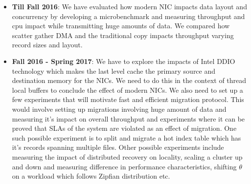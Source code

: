 \begin{itemize}
\item{\textbf{Till Fall 2016}:} We have evaluated how modern NIC impacts data layout 
and concurrency by developing a microbenchmark and measuring throughput and cpu 
impact while transmitting huge amounts of data. We compared how scatter gather DMA 
and the traditional copy impacts throughput varying record sizes and layout. 

\item{\textbf{Fall 2016 - Spring 2017}:} We have to explore the impacts of Intel\textregistered 
DDIO~\cite{ddio} technology which makes the last level cache the primary source and 
destination memory for the NICs. We need to do this in the context of thread local 
buffers to conclude the effect of modern NICs. We also need to set up a few experiments
that will motivate fast and efficient migration protocol. This would involve 
setting up migrations involving huge amount of data and measuring it's impact on overall throughput
and experiments where it can be proved that SLAs of the system are violated as an effect of migration.
One such possible experiment is to split and migrate a hot index table which has it's 
records spanning multiple files. Other possible experiments include measuring the 
impact of distributed recovery on locality, scaling a cluster up and down and measuring
difference in performance characteristics, shifting $\theta$ on a workload which follows 
Zipfian distribution etc.
\end{itemize}
